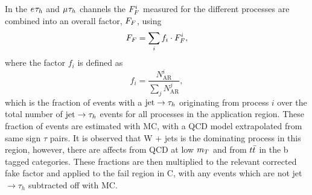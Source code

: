 In the $e_{}\tau_{h}$ and $\mu_{}\tau_{h}$ channels the $F_{F}^{i}$ measured for the different processes are combined into an overall factor, $F_{F}$, using
\begin{equation}
F_{F} = \sum_{i}f_{i}\cdot F_{F}^{i},
\end{equation}
where the factor $f_{i}$ is defined as
\begin{equation}
f_{i} = \frac{N_{\text{AR}}^{i}}{\sum\limits_{j}N_{\text{AR}}^{j}},
\end{equation}
which is the fraction of events with a $\text{jet}\rightarrow\tau_{h}$ originating from process $i$ over the total number of $\text{jet}\rightarrow\tau_{h}$ events for all processes in the application region.
These fraction of events are estimated with MC, with a QCD model extrapolated from same sign $\tau$ pairs.
It is observed that W + jets is the dominating process in this region, however, there are affects from QCD at low $m_{T}$ and from $t\bar{t}$ in the b tagged categories. These fractions are then multiplied to the relevant corrected fake factor and applied to the fail region in C, with any events which are not jet$\rightarrow\tau_h$ subtracted off with MC. \\

